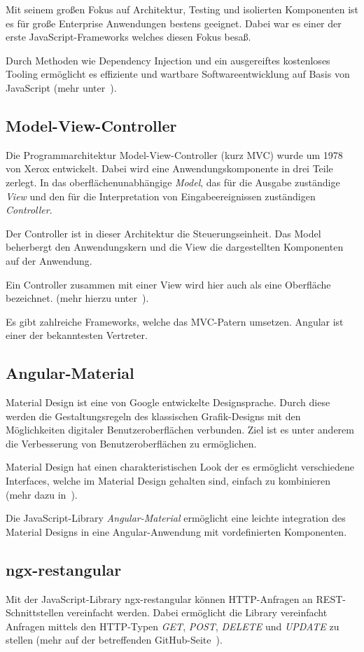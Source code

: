 Mit seinem großen Fokus auf Architektur, Testing und isolierten Komponenten ist es für große Enterprise Anwendungen
bestens geeignet. Dabei war es einer der erste JavaScript-Frameworks welches diesen Fokus besaß.

Durch Methoden wie Dependency Injection und ein ausgereiftes kostenloses Tooling ermöglicht es effiziente und wartbare
Softwareentwicklung auf Basis von JavaScript (mehr unter~\cite{book_grundlagen_angular}).

\subsection{Model-View-Controller}
Die Programmarchitektur Model-View-Controller (kurz MVC) wurde um 1978 von Xerox entwickelt. Dabei wird eine
Anwendungskomponente in drei Teile zerlegt. In das oberflächenunabhängige \textit{Model}, das für die
Ausgabe zuständige \textit{View} und den für die Interpretation von Eingabeereignissen zuständigen \textit{Controller}.

Der Controller ist in dieser Architektur die Steuerungseinheit. Das Model beherbergt den Anwendungskern und die View
die dargestellten Komponenten auf der Anwendung.

Ein Controller zusammen mit einer View wird hier auch als eine Oberfläche bezeichnet. (mehr hierzu
unter~\cite{book_grundlagen_mvc}).

Es gibt zahlreiche Frameworks, welche das MVC-Patern umsetzen. Angular ist einer der bekanntesten Vertreter.

\subsection{Angular-Material}
Material Design ist eine von Google entwickelte Designsprache. Durch diese werden die Gestaltungsregeln des klassischen
Grafik-Designs mit den Möglichkeiten digitaler Benutzeroberflächen verbunden. Ziel ist es unter anderem die Verbesserung
von Benutzeroberflächen zu ermöglichen.

Material Design hat einen charakteristischen Look der es ermöglicht verschiedene Interfaces, welche im Material Design
gehalten sind, einfach zu kombinieren (mehr dazu in~\cite{online_grundlagen_materialdesign}).

Die JavaScript-Library \textit{Angular-Material} ermöglicht eine leichte integration des Material Designs in eine
Angular-Anwendung mit vordefinierten Komponenten.

\subsection{ngx-restangular}
Mit der JavaScript-Library ngx-restangular können HTTP-Anfragen an REST-Schnitt\-stellen vereinfacht werden. Dabei
ermöglicht die Library vereinfacht Anfragen mittels den HTTP-Typen \textit{GET}, \textit{POST}, \textit{DELETE} und
\textit{UPDATE} zu stellen (mehr auf der betreffenden GitHub-Seite~\cite{online_grundlagen_restangular}).

